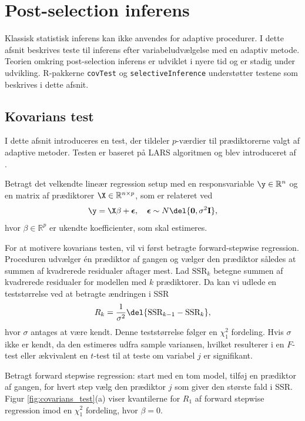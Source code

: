 \section{Post-selection inferens}
Klassisk statistisk inferens kan ikke anvendes for adaptive procedurer.
I dette afsnit beskrives teste til inferens efter variabeludvælgelse med en adaptiv metode.
Teorien omkring post-selection inferens er udviklet i nyere tid og er stadig under udvikling.
R-pakkerne \texttt{covTest} og \texttt{selectiveInference} understøtter testene som beskrives i dette afsnit.

\subsection{Kovarians test} \label{subsec:kovarians_test}
I dette afsnit introduceres en test, der tildeler \(p\)-værdier til prædiktorerne valgt af adaptive metoder.
Testen er baseret på LARS algoritmen og blev introduceret af \citep{lockhart}.

Betragt det velkendte lineær regression setup med en responsvariable \(\y \in \mathbb{R}^n\) og en matrix af prædiktorer \(\X \in \mathbb{R}^{n \times p}\), som er relateret ved
\begin{align}
\y = \X \beta + \boldsymbol{\epsilon}, \quad \boldsymbol{\epsilon} \sim N\del{\mathbf{0}, \sigma^2 \mathbf{I}}, \label{eq:set-up}
\end{align}
hvor \(\beta \in \mathbb{R}^p\) er ukendte koefficienter, som skal estimeres.

For at motivere kovarians testen, vil vi først betragte forward-stepwise regression.
Proceduren udvælger én prædiktor af gangen og vælger den prædiktor således at summen af kvadrerede residualer aftager mest.
Lad \(\text{SSR}_k\) betegne summen af kvadrerede residualer for modellen med \(k\) prædiktorer.
Da kan vi udlede en teststørrelse ved at betragte ændringen i SSR
\begin{align*}
R_k = \frac{1}{\sigma^2} \del{\text{SSR}_{k-1} - \text{SSR}_k},
\end{align*}
hvor \(\sigma\) antages at være kendt. 
Denne teststørrelse følger en \(\chi_1^2\) fordeling.
Hvis \(\sigma\) ikke er kendt, da den estimeres udfra sample variansen, hvilket resulterer i en \(F\)-test eller ækvivalent en \(t\)-test til at teste om variabel \(j\) er signifikant.

Betragt forward stepwise regression: start med en tom model, tilføj en prædiktor af gangen, for hvert step vælg den prædiktor \(j\) som giver den største fald i SSR.
Figur \ref{fig:covarians_test}(a) viser kvantilerne for \(R_1\) af forward stepwise regression imod en \(\chi_1^2\) fordeling, hvor \(\beta=0\).
 

